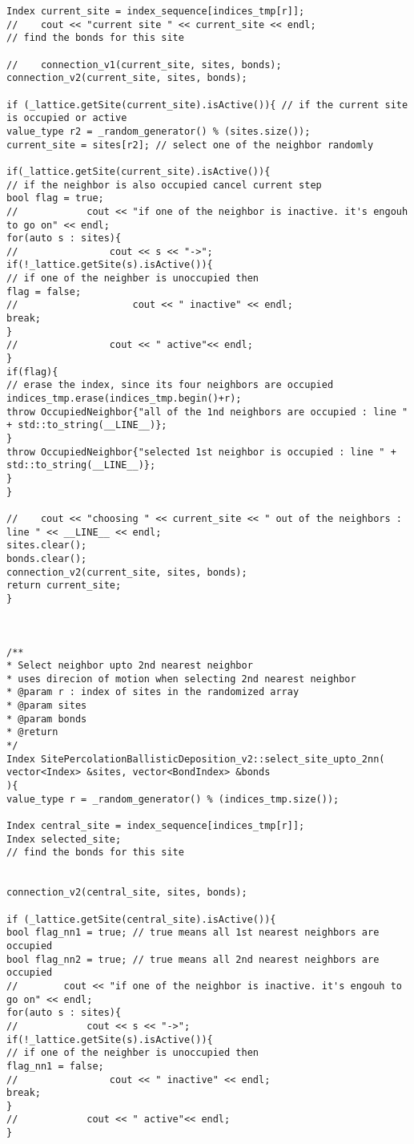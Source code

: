 \begin{lstlisting}[style=CStyle]
Index current_site = index_sequence[indices_tmp[r]];
//    cout << "current site " << current_site << endl;
// find the bonds for this site

//    connection_v1(current_site, sites, bonds);
connection_v2(current_site, sites, bonds);

if (_lattice.getSite(current_site).isActive()){ // if the current site is occupied or active
value_type r2 = _random_generator() % (sites.size());
current_site = sites[r2]; // select one of the neighbor randomly

if(_lattice.getSite(current_site).isActive()){
// if the neighbor is also occupied cancel current step
bool flag = true;
//            cout << "if one of the neighbor is inactive. it's engouh to go on" << endl;
for(auto s : sites){
//                cout << s << "->";
if(!_lattice.getSite(s).isActive()){
// if one of the neighber is unoccupied then
flag = false;
//                    cout << " inactive" << endl;
break;
}
//                cout << " active"<< endl;
}
if(flag){
// erase the index, since its four neighbors are occupied
indices_tmp.erase(indices_tmp.begin()+r);
throw OccupiedNeighbor{"all of the 1nd neighbors are occupied : line " + std::to_string(__LINE__)};
}
throw OccupiedNeighbor{"selected 1st neighbor is occupied : line " + std::to_string(__LINE__)};
}
}

//    cout << "choosing " << current_site << " out of the neighbors : line " << __LINE__ << endl;
sites.clear();
bonds.clear();
connection_v2(current_site, sites, bonds);
return current_site;
}



/**
* Select neighbor upto 2nd nearest neighbor
* uses direcion of motion when selecting 2nd nearest neighbor
* @param r : index of sites in the randomized array
* @param sites
* @param bonds
* @return
*/
Index SitePercolationBallisticDeposition_v2::select_site_upto_2nn(
vector<Index> &sites, vector<BondIndex> &bonds
){
value_type r = _random_generator() % (indices_tmp.size());

Index central_site = index_sequence[indices_tmp[r]];
Index selected_site;
// find the bonds for this site


connection_v2(central_site, sites, bonds);

if (_lattice.getSite(central_site).isActive()){
bool flag_nn1 = true; // true means all 1st nearest neighbors are occupied
bool flag_nn2 = true; // true means all 2nd nearest neighbors are occupied
//        cout << "if one of the neighbor is inactive. it's engouh to go on" << endl;
for(auto s : sites){
//            cout << s << "->";
if(!_lattice.getSite(s).isActive()){
// if one of the neighber is unoccupied then
flag_nn1 = false;
//                cout << " inactive" << endl;
break;
}
//            cout << " active"<< endl;
}


\end{lstlisting}
